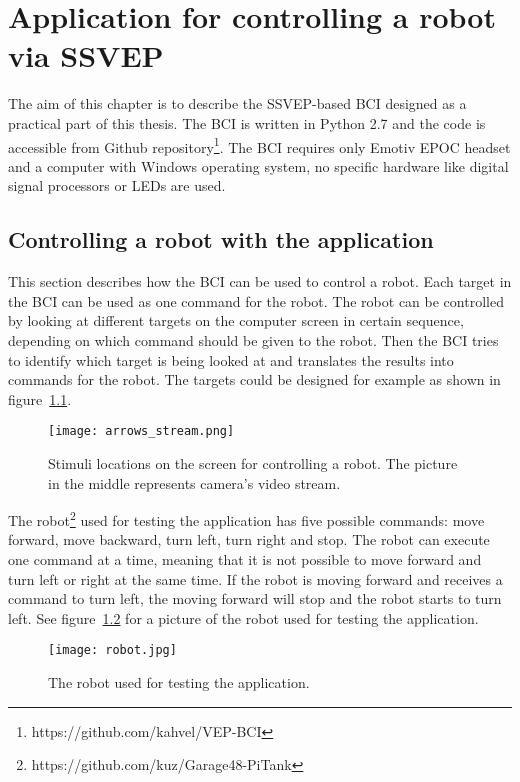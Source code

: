 
\chapter{Application for controlling a robot via SSVEP}
\label{sec:SSVEP_BCI}

The aim of this chapter is to describe the \gls{SSVEP}-based \gls{BCI} designed as a practical part of this thesis. The \gls{BCI} is written in Python 2.7 and the code is accessible from Github repository\footnote{https://github.com/kahvel/VEP-BCI}. The \gls{BCI} requires only Emotiv EPOC headset and a computer with Windows operating system, no specific hardware like digital signal processors or \glspl{LED} are used.

\section{Controlling a robot with the application}

This section describes how the \gls{BCI} can be used to control a robot. Each \gls{target} in the \gls{BCI} can be used as one command for the robot. The robot can be controlled by looking at different \glspl{target} on the computer screen in certain sequence, depending on which command should be given to the robot. Then the \gls{BCI} tries to identify which \gls{target} is being looked at and translates the results into commands for the robot. The \glspl{target} could be designed for example as shown in figure~\ref{fig:arrow_stimuli}.

\begin{figure}[h]
	\centering
	\texttt{[image: arrows\_stream.png]}
	\caption{Stimuli locations on the screen for controlling a robot. The picture in the middle represents camera's video stream.}
	\label{fig:arrow_stimuli}
\end{figure}

The robot\footnote{https://github.com/kuz/Garage48-PiTank} used for testing the application has five possible commands: move forward, move backward, turn left, turn right and stop. The robot can execute one command at a time, meaning that it is not possible to move forward and turn left or right at the same time. If the robot is moving forward and receives a command to turn left, the moving forward will stop and the robot starts to turn left. See figure~\ref{fig:robot} for a picture of the robot used for testing the application.

\begin{figure}[h]
	\centering
	\texttt{[image: robot.jpg]}
	\caption{The robot used for testing the application.}
	\label{fig:robot}
\end{figure}

